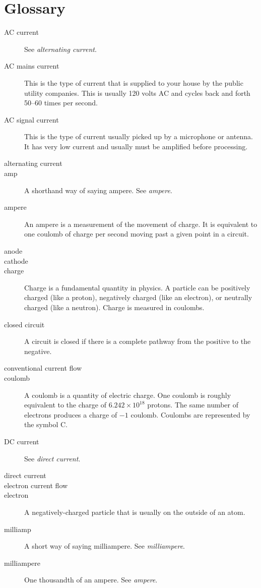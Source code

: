 \chapter{Glossary}
\label{chapGlossary}

\begin{description}
\item[AC current] See \emph{alternating current}.
\item[AC mains current] This is the type of current that is supplied to your house by the public utility companies.  This is usually 120 volts AC and cycles back and forth 50--60 times per second.
\item[AC signal current] This is the type of current usually picked up by a microphone or antenna.  It has very low current and usually must be amplified before processing.
\item[alternating current]
\item[amp] A shorthand way of saying ampere.  See \emph{ampere}.
\item[ampere] An ampere is a measurement of the movement of charge.  It is equivalent to one coulomb of charge per second moving past a given point in a circuit.
\item[anode]
\item[cathode]
\item[charge] Charge is a fundamental quantity in physics.  A particle can be positively charged (like a proton), negatively charged (like an electron), or neutrally charged (like a neutron).  Charge is measured in coulombs.
\item[closed circuit] A circuit is closed if there is a complete pathway from the positive to the negative.
\item[conventional current flow]
\item[coulomb] A coulomb is a quantity of electric charge.  One coulomb is roughly equivalent to the charge of $6.242×10^18$ protons.  The same number of electrons produces a charge of $-1$ coulomb.  Coulombs are represented by the symbol C.
\item[DC current] See \emph{direct current}.
\item[direct current]
\item[electron current flow]
\item[electron] A negatively-charged particle that is usually on the outside of an atom.
\item[milliamp] A short way of saying milliampere.  See \emph{milliampere}.
\item[milliampere] One thousandth of an ampere.  See \emph{ampere}.

\end{description}
